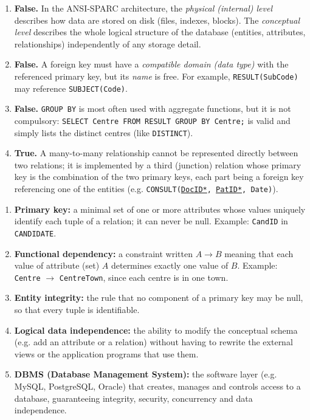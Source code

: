 \documentclass[11pt]{article}
\begin{document}
\begin{corrige}
\begin{enumerate}
\item \textbf{False.} In the ANSI-SPARC architecture, the \emph{physical (internal) level} describes how data are stored on disk (files, indexes, blocks). The \emph{conceptual level} describes the whole logical structure of the database (entities, attributes, relationships) independently of any storage detail.
\item \textbf{False.} A foreign key must have a \emph{compatible domain (data type)} with the referenced primary key, but its \emph{name} is free. For example, \texttt{RESULT(SubCode)} may reference \texttt{SUBJECT(Code)}.
\item \textbf{False.} \texttt{GROUP BY} is most often used with aggregate functions, but it is not compulsory: \texttt{SELECT Centre FROM RESULT GROUP BY Centre;} is valid and simply lists the distinct centres (like \texttt{DISTINCT}).
\item \textbf{True.} A many-to-many relationship cannot be represented directly between two relations; it is implemented by a third (junction) relation whose primary key is the combination of the two primary keys, each part being a foreign key referencing one of the entities (e.g. \texttt{CONSULT(\underline{DocID*}, \underline{PatID*}, Date)}).
\end{enumerate}
\end{corrige}

\begin{corrige}
\begin{enumerate}
\item \textbf{Primary key:} a minimal set of one or more attributes whose values uniquely identify each tuple of a relation; it can never be null. Example: \texttt{CandID} in \texttt{CANDIDATE}.
\item \textbf{Functional dependency:} a constraint written $A \rightarrow B$ meaning that each value of attribute (set) $A$ determines exactly one value of $B$. Example: \texttt{Centre} $\rightarrow$ \texttt{CentreTown}, since each centre is in one town.
\item \textbf{Entity integrity:} the rule that no component of a primary key may be null, so that every tuple is identifiable.
\item \textbf{Logical data independence:} the ability to modify the conceptual schema (e.g. add an attribute or a relation) without having to rewrite the external views or the application programs that use them.
\item \textbf{DBMS (Database Management System):} the software layer (e.g. MySQL, PostgreSQL, Oracle) that creates, manages and controls access to a database, guaranteeing integrity, security, concurrency and data independence.
\end{enumerate}
\end{corrige}
\end{document}
